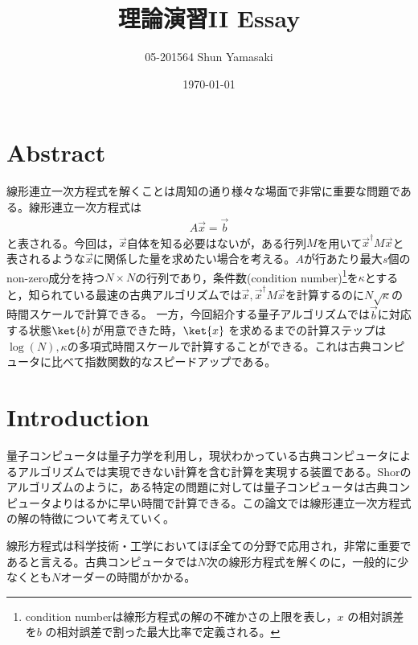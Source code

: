 \documentclass[b5paper,papersize,dvipdfmx,fleqn]{jsarticle}
\begin{document}
\title{理論演習II Essay}
\author{05-201564 Shun Yamasaki}
\date{\today}
\maketitle

\section{Abstract}
線形連立一次方程式を解くことは周知の通り様々な場面で非常に重要な問題である\cite{Harrow2009}。線形連立一次方程式は
\begin{eqnarray}
  A\vec{x} = \vec{b}
\end{eqnarray}
と表される。今回は，$\vec{x}$自体を知る必要はないが，ある行列$M$を用いて$\vec{x}^\dagger M \vec{x}$と表されるような$\vec{x}$に関係した量を求めたい場合を考える。$A$が行あたり最大$s$個のnon-zero成分を持つ$N\times N$の行列であり，条件数(condition number)\footnote{condition numberは線形方程式の解の不確かさの上限を表し，$x$ の相対誤差を$b$ の相対誤差で割った最大比率で定義される。}を$\kappa $とすると，知られている最速の古典アルゴリズムでは$\vec{x},\vec{x}^\dagger M \vec{x}$を計算するのに$N\sqrt{\kappa }$の時間スケールで計算できる。
一方，今回紹介する量子アルゴリズムでは$\vec{b}$に対応する状態$\ket{b}$が用意できた時，$\ket{x}$ を求めるまでの計算ステップは$\log(N),\kappa $の多項式時間スケールで計算することができる。これは古典コンピュータに比べて指数関数的なスピードアップである。

\section{Introduction}

量子コンピュータは量子力学を利用し，現状わかっている古典コンピュータによるアルゴリズムでは実現できない計算を含む計算を実現する装置である。Shorのアルゴリズムのように，ある特定の問題に対しては量子コンピュータは古典コンピュータよりはるかに早い時間で計算できる。この論文では線形連立一次方程式の解の特徴について考えていく。


線形方程式は科学技術・工学においてほぼ全ての分野で応用\cite{Harrow2009}され，非常に重要であると言える。古典コンピュータでは$N$次の線形方程式を解くのに，一般的に少なくとも$N$オーダーの時間がかかる。
\end{document}
